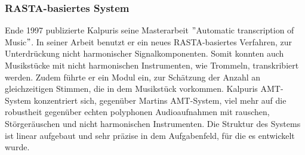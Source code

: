 \subsubsection{RASTA-basiertes System}
Ende 1997 publizierte Kalpuris seine Masterarbeit \("\)Automatic transcription of Music\("\).
\cite{klapuri1998automatic}
In seiner Arbeit benutzt er ein neues RASTA-basiertes Verfahren, zur Unterdrückung nicht harmonischer Signalkomponenten.
Somit konnten auch Musikstücke mit nicht harmonischen Instrumenten, wie Trommeln, transkribiert werden.
Zudem führte er ein Modul ein, zur Schätzung der Anzahl an gleichzeitigen Stimmen, die in dem Musikstück vorkommen.
Kalpuris AMT-System konzentriert sich, gegenüber Martins AMT-System, viel mehr auf die robustheit gegenüber
echten polyphonen Audioaufnahmen mit rauschen, Störgeräuschen und nicht harmonischen Instrumenten.
Die Struktur des Systems ist linear aufgebaut und sehr präzise in dem Aufgabenfeld, für die es entwickelt wurde.

\begin{center}
    \vspace{1em}
    \vspace{1em}
\end{center}

